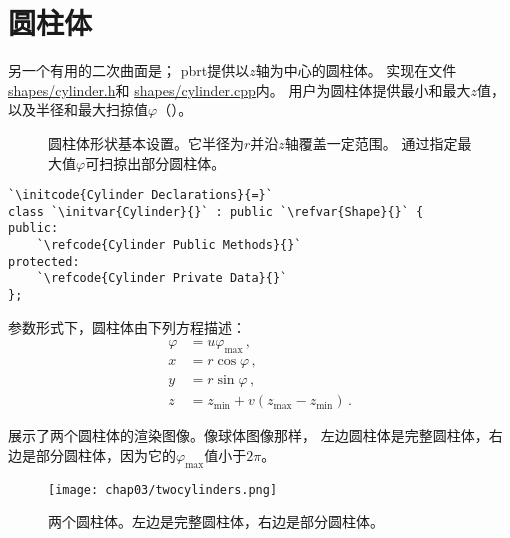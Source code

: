 \section{圆柱体}\label{sec:圆柱体}

另一个有用的二次曲面是；
pbrt提供以$z$轴为中心的圆柱体。
实现在文件\href{https://github.com/mmp/pbrt-v3/tree/master/src/shapes/cylinder.h}{\ttfamily shapes/cylinder.h}和
\href{https://github.com/mmp/pbrt-v3/tree/master/src/shapes/cylinder.cpp}{\ttfamily shapes/cylinder.cpp}内。
用户为圆柱体提供最小和最大$z$值，以及半径和最大扫掠值$\varphi$（）。
\begin{figure}[htbp]
    \centering
    \caption{圆柱体形状基本设置。它半径为$r$并沿$z$轴覆盖一定范围。
        通过指定最大值$\varphi$可扫掠出部分圆柱体。}
    \label{fig:3.6}
\end{figure}
\begin{lstlisting}
`\initcode{Cylinder Declarations}{=}`
class `\initvar{Cylinder}{}` : public `\refvar{Shape}{}` {
public:
    `\refcode{Cylinder Public Methods}{}`
protected:
    `\refcode{Cylinder Private Data}{}`
};
\end{lstlisting}

参数形式下，圆柱体由下列方程描述：
\begin{align*}
    \varphi & =u\varphi_{\max}\, ,               \\
    x       & =r\cos\varphi\, ,                  \\
    y       & =r\sin\varphi\, ,                  \\
    z       & =z_{\min}+v(z_{\max}-z_{\min})\, .
\end{align*}

展示了两个圆柱体的渲染图像。像球体图像那样，
左边圆柱体是完整圆柱体，右边是部分圆柱体，因为它的$\varphi_{\max}$值小于$2\pi$。
\begin{figure}[htbp]
    \centering\texttt{[image: chap03/twocylinders.png]}
    \caption{两个圆柱体。左边是完整圆柱体，右边是部分圆柱体。}
    \label{fig:3.7}
\end{figure}

